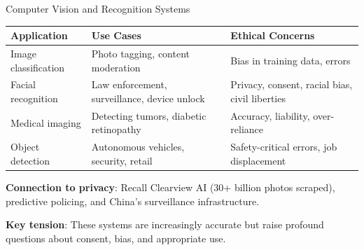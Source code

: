 \documentclass[aspectratio=169,11pt]{beamer}
\begin{document}
\begin{frame}{Computer Vision and Recognition Systems}
\begin{table}[h]
\centering
\scriptsize
\begin{tabular}{@{}p{2.5cm}p{4cm}p{5.5cm}@{}}
\toprule
\textbf{Application} & \textbf{Use Cases} & \textbf{Ethical Concerns} \\
\midrule
Image classification & Photo tagging, content moderation & Bias in training data, errors \\
\addlinespace
Facial recognition & Law enforcement, surveillance, device unlock & Privacy, consent, racial bias, civil liberties \\
\addlinespace
Medical imaging & Detecting tumors, diabetic retinopathy & Accuracy, liability, over-reliance \\
\addlinespace
Object detection & Autonomous vehicles, security, retail & Safety-critical errors, job displacement \\
\bottomrule
\end{tabular}
\end{table}

\vspace{0.2em}
\textbf{Connection to privacy}: Recall Clearview AI (30+ billion photos scraped), predictive policing, and China's surveillance infrastructure.

\vspace{0.2em}
\textbf{Key tension}: These systems are increasingly accurate but raise profound questions about consent, bias, and appropriate use.
\end{frame}
\end{document}
